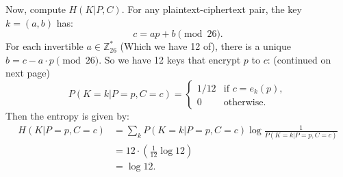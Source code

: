 \documentclass{article}
\begin{document}
Now, compute $H(K | P, C)$. For any plaintext-ciphertext pair, the key $k = (a, b)$ has:
\[
c = ap + b \pmod{26}.
\]
For each invertible $a \in \mathbb{Z}_{26}^*$ (Which we have 12 of), there is a unique $b = c - a \cdot p \pmod{26}$. So we have 12 keys that encrypt $p$ to $c$: (continued on next page)
\newpage
\[
P(K=k | P=p, C=c) = 
\begin{cases}
1/12 & \text{if } c = e_k(p), \\
0 & \text{otherwise}.
\end{cases}
\]
Then the entropy is given by:
\begin{align*}
    H(K | P=p, C=c) 
    &= \sum_{k} P(K=k | P=p, C=c) \log \frac{1}{P(K=k | P=p, C=c)} \\
    &= 12 \cdot \left( \frac{1}{12} \log 12 \right) \\
                      &= \log 12.
\end{align*}
\end{document}
